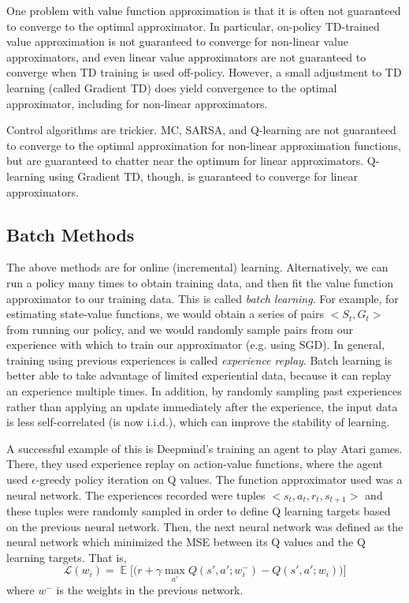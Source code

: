 \documentclass{article}
\DeclareMathOperator{\EX}{\mathbb{E}}
\newcommand{\ita}{\textit}
\newcommand{\eps}{\epsilon}
\begin{document}
One problem with value function approximation is that it is often not guaranteed to converge to the optimal approximator. In particular, on-policy TD-trained value approximation is not guaranteed to converge for non-linear value approximators, and even linear value approximators are not guaranteed to converge when TD training is used off-policy. However, a small adjustment to TD learning (called Gradient TD) does yield convergence to the optimal approximator, including for non-linear approximators.

Control algorithms are trickier. MC, SARSA, and Q-learning are not guaranteed to converge to the optimal approximation for non-linear approximation functions, but are guaranteed to chatter near the optimum for linear approximators. Q-learning using Gradient TD, though, is guaranteed to converge for linear approximators.

\subsection{Batch Methods}

The above methods are for online (incremental) learning. Alternatively, we can run a policy many times to obtain training data, and then fit the value function approximator to our training data. This is called \ita{batch learning}. For example, for estimating state-value functions, we would obtain a series of pairs $<S_t, G_t>$ from running our policy, and we would randomly sample pairs from our experience with which to train our approximator (e.g. using SGD). In general, training using previous experiences is called \ita{experience replay}. Batch learning is better able to take advantage of limited experiential data, because it can replay an experience multiple times. In addition, by randomly sampling past experiences rather than applying an update immediately after the experience, the input data is less self-correlated (is now i.i.d.), which can improve the stability of learning.

A successful example of this is Deepmind's training an agent to play Atari games. There, they used experience replay on action-value functions, where the agent used $\eps$-greedy policy iteration on Q values. The function approximator used was a neural network. The experiences recorded were tuples $<s_t, a_t, r_t, s_{t+1}>$ and these tuples were randomly sampled in order to define Q learning targets based on the previous neural network. Then, the next neural network was defined as the neural network which minimized the MSE between its Q values and the Q learning targets. That is,
$$\mathcal{L}(w_i) = \EX\bigg[\big(r+\gamma\max_{a'}Q(s', a'; w^-_i) - Q(s', a'; w_i)\big)\bigg]$$
where $w^-$ is the weights in the previous network.
\end{document}
